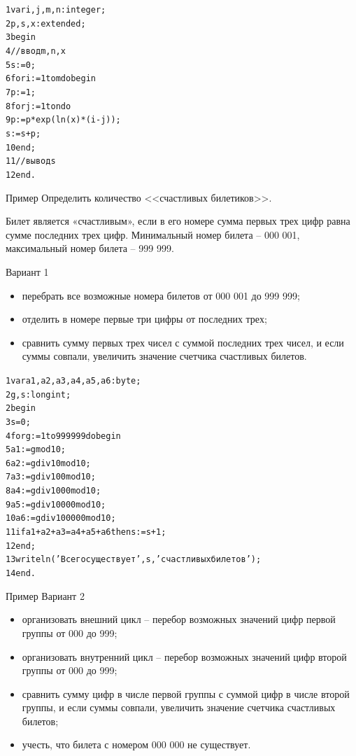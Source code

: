 \documentclass{beamer}
\begin{document}
\begin{frame}[fragile]
\begin{alltt}
1 var i, j, m, n: integer;
2     p, s, x: extended;
3 begin
4   //ввод m, n, x
5   s := 0;
6   for i := 1 to m do begin
7     p := 1;
8     for j := 1 to n do 
9       p := p * exp(ln(x) * (i - j));
      s := s + p;
10  end;
11  //вывод s
12 end.  
\end{alltt}
\end{frame}

\begin{frame}{Пример}
Определить количество <<счастливых билетиков>>.

Билет является «счастливым», если в его номере сумма первых трех цифр равна сумме последних трех цифр. Минимальный номер билета – 000 001, максимальный номер билета – 999 999. 

Вариант 1
\begin{itemize}
\item перебрать все возможные номера билетов от 000 001 до 999 999;
\item отделить в номере первые три цифры от последних трех;
\item сравнить сумму первых трех чисел с суммой последних трех чисел, и если суммы совпали, увеличить значение счетчика счастливых билетов.
\end{itemize}
\end{frame}

\begin{frame}[fragile]
\begin{alltt}
1 var  a1, a2, a3, a4, a5, a6: byte; 
2      g, s: longint;
2 begin
3   s = 0;
4   for g := 1 to 999999 do begin
5     a1 := g mod 10;
6     a2 := g div 10 mod 10;
7     a3 := g div 100 mod 10;
8     a4 := g div 1000 mod 10;
9     a5 := g div 10000 mod 10;
10    a6 := g div 100000 mod 10;
11    if a1 + a2 + a3 = a4 + a5 + a6 then s := s + 1;
12  end;
13  writeln('Всего существует ', s, ' счастливых билетов');
14 end.
\end{alltt}
\end{frame}

\begin{frame}{Пример}
Вариант 2
\begin{itemize}
\item организовать внешний цикл – перебор возможных значений цифр первой группы от 000 до 999;
\item организовать внутренний цикл – перебор возможных значений цифр второй группы от 000 до 999;
\item сравнить сумму цифр в числе первой группы с суммой цифр в числе второй группы, и если суммы совпали, увеличить значение счетчика счастливых билетов;
\item учесть, что билета с номером 000 000 не существует.
\end{itemize}
\end{frame}
\end{document}
